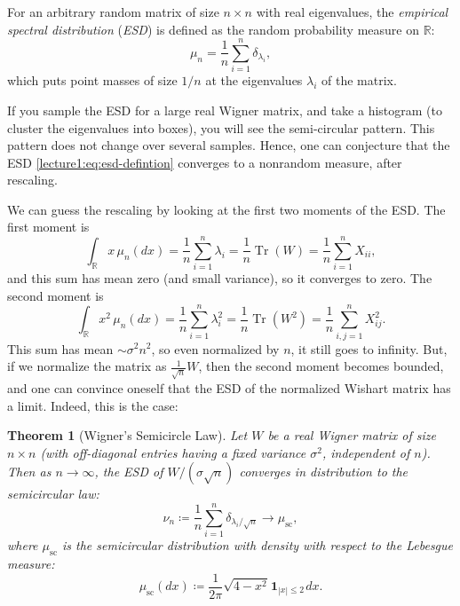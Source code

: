 \documentclass[letterpaper,11pt,oneside,reqno]{book}
\numberwithin{equation}{chapter}  %
\newcommand{\ssp}{\hspace{1pt}}
\newtheorem{theorem}[proposition]{Theorem}
\theoremstyle{definition}
\begin{document}
For an arbitrary random matrix of size $n\times n$ with real eigenvalues,
the \emph{empirical spectral distribution} (\emph{ESD}) is defined as the
random probability measure on $\mathbb{R}$:
\begin{equation}
	\label{lecture1:eq:esd-defintion}
	\mu_n = \frac{1}{n} \sum_{i=1}^n \delta_{\lambda_i},
\end{equation}
which puts point masses of size $1/n$ at the eigenvalues $\lambda_i$ of the matrix.

If you sample the ESD for a large real Wigner matrix,
and take a histogram (to cluster the eigenvalues into boxes),
you will see the semi-circular pattern. This pattern
does not change over several samples. Hence, one can
conjecture that the
ESD \eqref{lecture1:eq:esd-defintion} converges to a nonrandom
measure, after rescaling.

We can guess the rescaling by looking at the first two moments of the ESD.
The first moment is
\begin{equation}
	\label{lecture1:eq:first-moment-esd}
	\int_{\mathbb{R}} x \, \mu_n(dx) = \frac{1}{n} \sum_{i=1}^n \lambda_i=
	\frac{1}{n} \operatorname{Tr}(W) =
	\frac{1}{n}\sum_{i=1}^n X_{ii},
\end{equation}
and this sum has mean zero (and small variance), so it converges to zero.
The second moment is
\begin{equation}
	\label{lecture1:eq:second-moment-esd}
	\int_{\mathbb{R}} x^2 \, \mu_n(dx) = \frac{1}{n} \sum_{i=1}^n \lambda_i^2=
	\frac{1}{n} \operatorname{Tr}(W^2) =
	\frac{1}{n}
	\sum_{i,j=1}^n X_{ij}^2.
\end{equation}
This sum has mean $\sim \sigma^2 n^2$, so even normalized by $n$,
it still goes to infinity.
But, if we normalize the matrix as $\frac{1}{\sqrt n}W$,
then the second moment
becomes bounded, and one can convince oneself that the
ESD of the normalized Wishart matrix has a limit.
Indeed, this is the case:

\begin{theorem}[Wigner's Semicircle Law]
	\label{lecture1:thm:esd-semicircle}
	Let $W$ be a real Wigner matrix of size $n\times n$
	(with off-diagonal entries having a fixed variance $\sigma^2$, independent of $n$).
	Then
	as $n\to\infty$,
	the ESD of $W/(\sigma\sqrt{n})$ converges in distribution to the semicircular law:
	\begin{equation}
		\label{lecture1:eq:thm-esd-semicircle}
		\nu_n\coloneqq \frac{1}{n}\sum_{i=1}^{n}\delta_{\lambda_i/\sqrt{n}}
		\longrightarrow \mu_{\mathrm{sc}},
	\end{equation}
	where $\mu_{\mathrm{sc}}$ is the semicircular distribution with density
	with respect to the Lebesgue measure:
	\begin{equation}
		\label{lecture1:eq:semicircle-density-defintion}
		\mu_{\mathrm{sc}}(dx) \coloneqq \frac{1}{2\pi} \sqrt{4-x^2} \ssp \mathbf{1}_{|x| \leq 2}\ssp
		dx.
	\end{equation}
\end{theorem}
\end{document}
